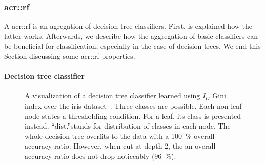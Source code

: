         \subsubsection{\acrlong*{acr::rf}}
            \label{subsubsec::state_of_the_art::mlpr::classifiers::rf}
            A \gls{acr::rf} is an agregation of decision tree classifiers.
            First, is explained how the latter works.
            Afterwards, we describe how the aggregation of basic classifiers can be beneficial for classification, especially in the case of decision trees.
            We end this Section discussing some \gls{acr::rf} properties.

            \paragraph{Decision tree classifier}
                \begin{figure}[htbp]
                    \centering
                    
                    \caption[
                        A visualization of a decision tree classifier learned using $I_G$ Gini index over the iris dataset.
                    ]{
                        \label{fig::decision_tree_graph}
                        A visualization of a decision tree classifier learned using $I_G$ Gini index over the iris dataset~\parencite{fisher1936use}.
                        Three classes are possible.
                        Each non leaf node states a thresholding condition.
                        For a leaf, its class is presented instead.
                        ``dist.''stands for distribution of classes in each node.
                        The whole decision tree overfits to the data with a \SI{100}{\percent} overall accuracy ratio.
                        However, when cut at depth 2, the an overall accuracy ratio does not drop noticeably (\SI{96}{\percent}).
                    }
                \end{figure}

